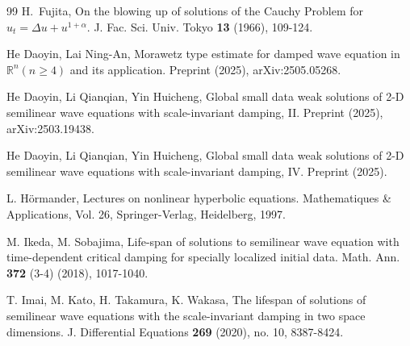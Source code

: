 \documentclass[11pt,twoside]{article}
\newcommand{\R}{\mathbb R}
\newcommand{\al}{\alpha}
\theoremstyle{plain}
\theoremstyle{definition}
\theoremstyle{remark}
\numberwithin{equation}{section}
\begin{document}
\begin{thebibliography}{99}
 H.~Fujita, On the blowing up of solutions of the
Cauchy Problem for $u_t=\Delta u+u^{1+\al}$.
J. Fac. Sci. Univ. Tokyo \textbf{13} (1966), 109-124.









 He Daoyin, Lai Ning-An, Morawetz type estimate for damped wave equation in $\R^n (n\geq 4)$ and its application.
Preprint (2025), arXiv:2505.05268.



 He Daoyin, Li Qianqian, Yin Huicheng,
Global small data weak solutions of 2-D semilinear wave equations
with  scale-invariant  damping, II. Preprint (2025), arXiv:2503.19438.

 He Daoyin, Li Qianqian, Yin Huicheng,
Global small data weak solutions of 2-D semilinear wave equations
with  scale-invariant  damping, IV. Preprint (2025).



 L. H\"ormander, Lectures on nonlinear hyperbolic equations.
Mathematiques \& Applications, Vol. 26, Springer-Verlag, Heidelberg, 1997.










M. Ikeda, M. Sobajima, Life-span of solutions to semilinear wave equation with time-dependent critical damping for specially
localized initial data. Math. Ann. \textbf{372} (3-4) (2018), 1017-1040.

 T. Imai, M. Kato, H. Takamura, K. Wakasa,
The lifespan of solutions of semilinear wave equations with the scale-invariant damping in two space dimensions.
J. Differential Equations \textbf{269} (2020), no. 10, 8387-8424.







\end{thebibliography}
\end{document}
